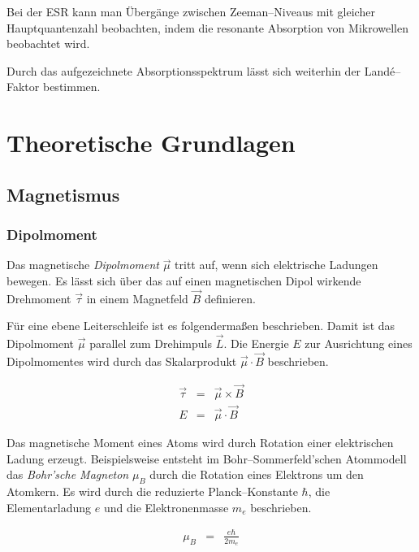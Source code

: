 \documentclass[12pt,a4paper]{scrartcl}
\numberwithin{equation}{section} %
\begin{document}
Bei der ESR kann man Übergänge zwischen Zeeman--Niveaus mit gleicher
Hauptquantenzahl beobachten, indem die resonante Absorption von
Mikrowellen beobachtet wird.

Durch das aufgezeichnete Absorptionsspektrum lässt sich weiterhin der
Landé--Faktor bestimmen.

\clearpage
\hypertarget{theoretische-grundlagen}{%
\section{Theoretische Grundlagen}\label{theoretische-grundlagen}}

\hypertarget{magnetismus}{%
\subsection{Magnetismus}\label{magnetismus}}

\hypertarget{dipolmoment}{%
\subsubsection{Dipolmoment}\label{dipolmoment}}

Das magnetische \emph{Dipolmoment} $\vec \mu$ tritt auf, wenn sich
elektrische Ladungen bewegen. Es lässt sich über das auf einen
magnetischen Dipol wirkende Drehmoment $\vec \tau$ in einem Magnetfeld
$\vec B$ definieren.

Für eine ebene Leiterschleife ist es folgendermaßen beschrieben.
\cite{Jackson} Damit ist das Dipolmoment $\vec \mu$ parallel zum
Drehimpuls $\vec{L}$. Die Energie $E$ zur Ausrichtung eines
Dipolmomentes wird durch das Skalarprodukt $\vec \mu \cdot \vec B$
beschrieben.

\begin{eqnarray}
    \vec \tau &=& \vec \mu \times \vec B \\
    E &=& \vec \mu \cdot \vec B
\end{eqnarray}

Das magnetische Moment eines Atoms wird durch Rotation einer
elektrischen Ladung erzeugt. Beispielsweise entsteht im
Bohr--Sommerfeld'schen Atommodell das \emph{Bohr'sche Magneton}
$\mu_B$ durch die Rotation eines Elektrons um den Atomkern. Es wird
durch die reduzierte Planck--Konstante $\hbar$, die Elementarladung
$e$ und die Elektronenmasse $m_e$ beschrieben.

\begin{eqnarray}
    \mu_B &=& \frac{e\hbar}{2m_e}
\end{eqnarray}
\end{document}

